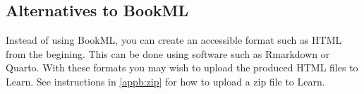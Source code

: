 \subsection{Alternatives to BookML}
Instead of using BookML, you can create an accessible format such as HTML from the begining.
This can be done using software such as Rmarkdown or Quarto. With these formats you may wish to upload the produced HTML files to Learn. See instructions in \ref{appb:zip} for how to upload a zip file to Learn.

